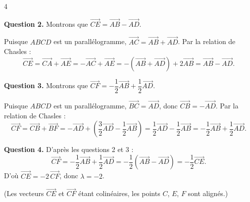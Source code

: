 \documentclass[12pt]{article}
\begin{document}
\begin{exercice}{4}{}

\textbf{Question 2.} Montrons que $\overrightarrow{CE} = \overrightarrow{AB} - \overrightarrow{AD}$.

\medskip
\noindent Puisque $ABCD$ est un parallélogramme, $\overrightarrow{AC} = \overrightarrow{AB} + \overrightarrow{AD}$. Par la relation de Chasles :
\[
\overrightarrow{CE} = \overrightarrow{CA} + \overrightarrow{AE}
= -\overrightarrow{AC} + \overrightarrow{AE}
= -\left(\overrightarrow{AB} + \overrightarrow{AD}\right) + 2\overrightarrow{AB}
= \overrightarrow{AB} - \overrightarrow{AD}.
\]



\textbf{Question 3.} Montrons que $\overrightarrow{CF} = -\dfrac{1}{2}\overrightarrow{AB} + \dfrac{1}{2}\overrightarrow{AD}$.

\medskip
\noindent Puisque $ABCD$ est un parallélogramme, $\overrightarrow{BC} = \overrightarrow{AD}$, donc $\overrightarrow{CB} = -\overrightarrow{AD}$. Par la relation de Chasles :
\[
\overrightarrow{CF} = \overrightarrow{CB} + \overrightarrow{BF}
= -\overrightarrow{AD} + \left(\frac{3}{2}\overrightarrow{AD} - \frac{1}{2}\overrightarrow{AB}\right)
= \frac{1}{2}\overrightarrow{AD} - \frac{1}{2}\overrightarrow{AB}
= -\frac{1}{2}\overrightarrow{AB} + \frac{1}{2}\overrightarrow{AD}.
\]

\bigskip
\textbf{Question 4.} D'après les questions 2 et 3 :
\[
\overrightarrow{CF} = -\frac{1}{2}\overrightarrow{AB} + \frac{1}{2}\overrightarrow{AD}
= -\frac{1}{2}\left(\overrightarrow{AB} - \overrightarrow{AD}\right)
= -\frac{1}{2}\overrightarrow{CE}.
\]
D'où $\overrightarrow{CE} = -2\,\overrightarrow{CF}$, donc $\lambda = -2$.

\medskip
\noindent (Les vecteurs $\overrightarrow{CE}$ et $\overrightarrow{CF}$ étant colinéaires, les points $C$, $E$, $F$ sont alignés.)
\end{exercice}
\end{document}
